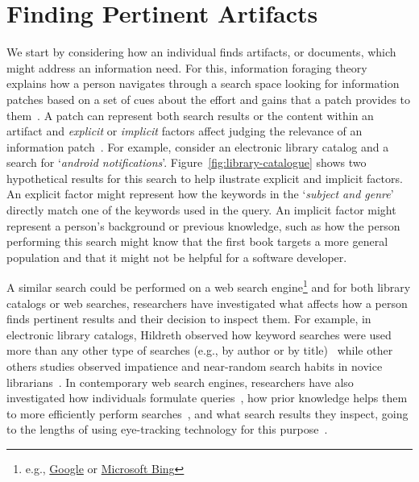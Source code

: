 


\section{Finding Pertinent Artifacts}
\label{cp2:searching}


We start by considering how an individual finds 
artifacts, or documents, which might 
address an information need. 
For this, information foraging theory~\cite{Pirolli1999} explains how a person navigates through  
a search space looking for information patches  based on 
a set of cues about the effort and gains that a patch provides to them~\cite{Pirolli1999}.
A patch can represent both search results or the content within an artifact
and \textit{explicit} or \textit{implicit} factors affect judging the relevance 
of an information patch~\cite{saracevic1975}.
For example,
consider an electronic library catalog and a search for `\textit{android notifications}'.
Figure~\ref{fig:library-catalogue} shows two hypothetical results for this search
to help ilustrate explicit and implicit factors.
An explicit factor might represent how the keywords in the `\textit{subject and genre}' 
directly match one of the keywords used in the query. An implicit factor might represent 
a person's background or previous knowledge, such as how 
the person performing this search 
might know that the first book targets a more general population and 
that it might not be helpful for a software developer.








A similar search could be performed on a web search engine\footnote{e.g., \href{https://www.google.com/}{Google} or \href{https://www.bing.com/}{Microsoft Bing}}
and for both library catalogs or web searches, researchers have investigated 
what affects how a person finds pertinent results and their decision to inspect them.
For example, in electronic library catalogs,
Hildreth observed how keyword searches were used more than any other type of searches (e.g., by author or by title)~\cite{hildreth1997}
while other 
others studies observed impatience and near-random search habits in novice librarians~\cite{novotny2004don}.
In contemporary web search engines, researchers have  also 
investigated how individuals formulate queries~\cite{gross2005have, bendersky2012},
how prior knowledge helps them
to more efficiently perform searches~\cite{DeGraaf2014},
and what search results they inspect, going to the lengths
of using eye-tracking technology for this purpose~\cite{Cutrell2007, marcos2015}.



